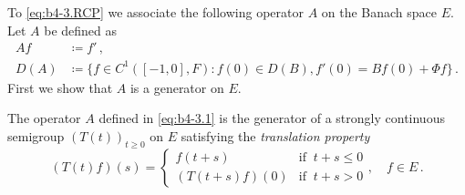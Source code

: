 To \eqref{eq:b4-3.RCP} we associate the following operator $A$ on the Banach space $E$.
Let $A$ be defined as
\begin{equation}\label{eq:b4-3.1}
	\begin{aligned}
		Af & \coloneq  f' \,,\\
		D(A) & \coloneq  \{f \in C^1([-1,0],F) \colon f(0) \in D(B), f'(0) = Bf(0) + \Phi f\}\,.
	\end{aligned}
\end{equation}
First we show that $A$ is a generator on $E$.
\begin{theorem}\label{thm:b4-3.1}
	The operator $A$ defined in \eqref{eq:b4-3.1} is the generator of a strongly continuous semigroup $(T(t))_{t\geq 0}$ on $E$ satisfying the \emph{translation property}
\begin{equation*}\label{eq:b4-3.T} \tag{T}
    (T(t)f)(s) = 
    \begin{cases} 
        f(t+s) & \text{if } \ t+s \leq 0 \\
        (T(t+s)f)(0) & \text{if } \ t+s  >  0 
    \end{cases}, \quad f \in E\,.
\end{equation*}
\end{theorem}
